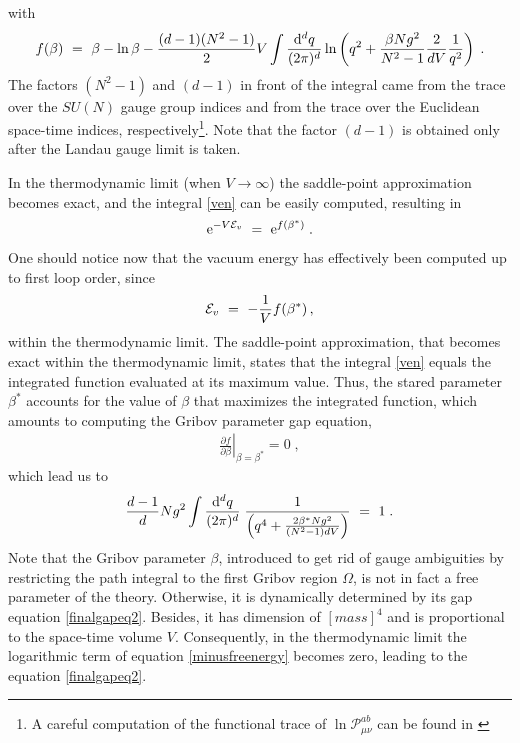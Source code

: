with
\begin{eqnarray}
f(\beta) ~=~ \beta - \ln \beta  -\frac{(d-1)(N^2 - 1)}{2}  V \int \frac{\mathrm{d}^d q}{(2\pi)^d} \ln \left( q^2 + \frac{\beta N g^2 }{N^2 - 1} \frac{2}{d V}\frac{1}{q^2} \right)\;.
\label{minusfreenergy}
\end{eqnarray}
The factors $(N^{2}-1)$ and $(d-1)$ in front of the integral came from the trace over the
$SU(N)$ gauge group indices and from the trace over the Euclidean space-time indices,
respectively\footnote{ A careful computation of the functional trace of $\ln
\mathcal{P}_{\mu\nu}^{ab}$ can be found in \cite{Vandersickel:2012tz}}. Note that the factor
$(d-1)$ is obtained only after the Landau gauge limit is taken.

In the thermodynamic limit (when $V\to \infty$) the saddle-point approximation becomes exact,
and the integral \eqref{ven} can be easily computed, resulting in
\begin{eqnarray}
\mathrm{e}^{-V{\cal E}_{v}} ~=~  \mathrm{e}^{f(\beta^{\ast})} \;.
\label{relatvaccener}
\end{eqnarray}
One should notice now that the vacuum energy has effectively been computed up to first loop
order, since 
\begin{eqnarray}
{\cal E}_{v} ~=~ -\frac{1}{V}f(\beta^{\ast})\,,
\end{eqnarray}
within the thermodynamic limit. The saddle-point approximation, that becomes exact within the
thermodynamic limit, states that the integral \eqref{ven} equals the integrated function
evaluated at its maximum value. Thus, the stared parameter $\beta^{\ast}$ accounts for the
value of $\beta$ that maximizes the integrated function, which amounts to computing the Gribov
parameter gap equation,
\begin{eqnarray}
\left.
\frac{\partial f}{\partial \beta}\right|_{\beta = \beta^{\ast}}=0\;,
\label{gapeq}
\end{eqnarray}
which lead us to
\begin{eqnarray}
\frac{d-1}{d}N g^2    \int \frac{\mathrm{d}^d q}{(2\pi)^d}  \;   \frac{1}{ \left( q^4 + \frac{2\beta^{\ast} N g^2}{(N^2 - 1)dV} \right) }  ~=~ 1   \;.
\label{finalgapeq2}
\end{eqnarray}
Note that the Gribov parameter $\beta$, introduced to get rid of gauge ambiguities by
restricting the path integral to the first Gribov region $\Omega$, is not in fact a free
parameter of the theory. Otherwise, it is dynamically determined by its gap equation
\eqref{finalgapeq2}. Besides, it has dimension of $[mass]^{4}$ and is proportional to the
space-time volume $V$. Consequently, in the thermodynamic limit the logarithmic term of
equation \eqref{minusfreenergy} becomes zero, leading to the equation \eqref{finalgapeq2}.




















